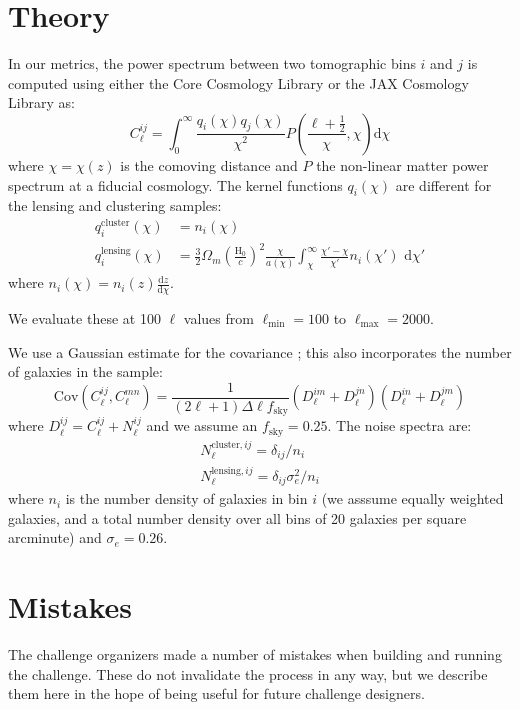\documentclass[twocolumn,twocolappendix]{aastex63}
\begin{document}



\appendix

\section{Theory}\label{app:theory}
In our metrics, the power spectrum between two tomographic bins $i$ and $j$ is computed using either the Core Cosmology Library \citep{ccl} or the JAX Cosmology Library \citep{jax-cosmo} as:
\begin{equation}
    C^{ij}_\ell = \int_0^{\infty} \frac{q_i(\chi) q_j(\chi)}{\chi^2} P\left(\frac{\ell +\frac{1}{2}}{\chi}, \chi \right) \mathrm{d}\chi
\end{equation}
where $\chi = \chi(z)$ is the comoving distance and $P$ the non-linear matter power spectrum at
a fiducial cosmology.  The kernel functions $q_i(\chi)$ are different for the lensing and clustering samples:
\begin{align}
    q^{\mathrm{cluster}}_i(\chi) &= n_i(\chi)\\
    q^{\mathrm{lensing}}_i(\chi) &= \frac{3}{2}\Omega_m \left(\frac{\mathrm{H}_0}{c}\right)^2 \frac{\chi}{a(\chi)} \int_\chi^{\infty} \frac{\chi' - \chi}{\chi'} n_i(\chi')\,\,\mathrm{d}\chi'
\end{align}
where $n_i(\chi) = n_i(z) \frac{\mathrm{d}z}{\mathrm{d}\chi}$.

We evaluate these at 100 $\ell$ values from $\ell_\mathrm{min}=100$ to $\ell_\mathrm{max}=2000$.

We use a Gaussian estimate for the covariance \citep{takada_jain}; this also incorporates the number of galaxies in the
sample:
\begin{equation}
    \mathrm{Cov}(C^{ij}_\ell, C^{mn}_\ell) = \frac{1}{(2 \ell + 1)\Delta\ell f_\mathrm{sky}}(D^{im}_\ell + D^{jn}_\ell)(D^{in}_\ell + D^{jm}_\ell)
\end{equation}
where $D^{ij}_\ell = C^{ij}_\ell + N^{ij}_\ell$ and we assume an $f_\mathrm{sky}=0.25$.  The noise spectra are:
\begin{align}
N^{\mathrm{cluster},ij}_\ell = \delta_{ij} / n_i \\
N^{\mathrm{lensing},ij}_\ell = \delta_{ij} \sigma_e^2 / n_i
\end{align}
where $n_i$ is the number density of galaxies in bin $i$ (we asssume equally weighted galaxies, and a 
total number density over all bins of 20 galaxies per square arcminute) and $\sigma_e=0.26$.

\section{Mistakes}
The challenge organizers made a number of mistakes when building and running the challenge.
These do not invalidate the process in any way, but we describe them here in the hope of
being useful for future challenge designers.
\end{document}
